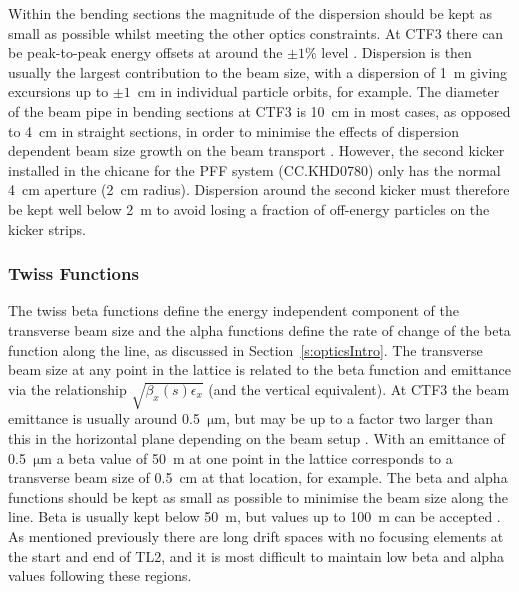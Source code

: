 Within the bending sections the magnitude of the dispersion should be kept as small as possible whilst meeting the other optics constraints. At CTF3 there can be peak-to-peak energy offsets at around the \(\pm1\%\) level \cite{CTF3}. Dispersion is then usually the largest contribution to the beam size, with a dispersion of 1~m giving excursions up to \(\pm1\)~cm in individual particle orbits, for example. The diameter of the beam pipe in bending sections at CTF3 is 10~cm in most cases, as opposed to 4~cm in straight sections, in order to minimise the effects of dispersion dependent beam size growth on the beam transport \cite{CTF3}. However, the second kicker installed in the chicane for the PFF system (CC.KHD0780) only has the normal 4~cm aperture (2~cm radius).  Dispersion around the second kicker must therefore be kept well below 2~m to avoid losing a fraction of off-energy particles on the kicker strips.

\subsubsection{Twiss Functions}


The twiss beta functions define the energy independent component of the transverse beam size and the alpha functions define the rate of change of the beta function along the line, as discussed in Section~\ref{s:opticsIntro}. The transverse beam size at any point in the lattice is related to the beta function and emittance via the relationship \(\sqrt{\beta_x(s)\epsilon_x}\) (and the vertical equivalent). At CTF3 the beam emittance is usually around 0.5~\(\mathrm{\mu m}\), but may be up to a factor two larger than this in the horizontal plane depending on the beam setup \cite{davideThesis}. With an emittance of 0.5~\(\mathrm{\mu m}\) a beta value of 50~m at one point in the lattice corresponds to a transverse beam size of 0.5~cm at that location, for example. The beta and alpha functions should be kept as small as possible to minimise the beam size along the line. Beta is usually kept below 50~m, but values up to 100~m can be accepted \cite{piotrPriv}. As mentioned previously there are long drift spaces with no focusing elements at the start and end of TL2, and it is most difficult to maintain low beta and alpha values following these regions.

